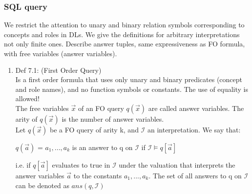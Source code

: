 \documentclass[11pt]{article}
\begin{document}
\subsubsection{SQL query \\}
\label{sec-1-1-2}
We restrict the attention to unary and binary relation symbols 
corresponding to concepts and roles in DLs. We give the definitions
for arbitrary interpretations not only finite ones.
Describe answer tuples, same expressiveness as FO formula, with 
free variables (answer variables).
\begin{enumerate}
\item Def 7.1: (First Order Query) \\
\label{sec-1-1-2-1}
Is a first order formula that uses only unary and binary 
predicates (concept and role names), and no function symbols or 
constants. The use of equality is allowed!\\
     The free variables $\overset{\to}{x}$ of an FO query 
$q(\overset{\to}{x})$ are called answer variables. The arity of 
$q(\overset{\to}{x})$ is the number of answer variables.\\
     Let $q(\overset{\to}{x})$ be a FO query of arity k, and $\mathcal{I}$
an interpretation. We say that:
\begin{center}
$q(\overset{\to}{a})$ = $a_{1}, ..., a_{k}$ is an answer to q on 
$\mathcal{I}$ if $\mathcal{I} \models q[\overset{\to}{a}]$\\
\end{center}
i.e. if $q[\overset{\to}{a}]$ evaluates to true in $\mathcal{I}$ under 
the valuation that interprets the answer variables $\overset{\to}{a}$ 
to the constants $a_{1}, ..., a_{k}$. The set of all answers to q 
on $\mathcal{I}$ can be denoted as $ans(q,\mathcal{I})$ 


\end{enumerate}
\end{document}
